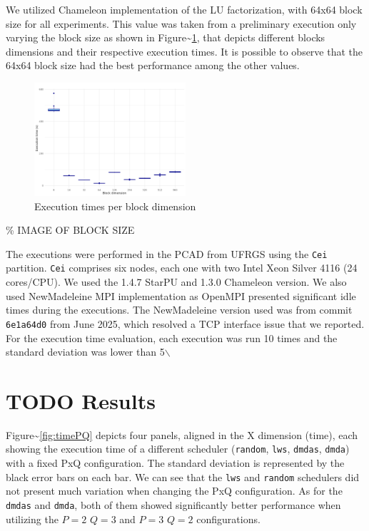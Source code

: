 \documentclass[conference, 10pt, final]{IEEEtran}
\begin{document}
We utilized Chameleon \cite{agullo:inria-00547847} implementation of the LU factorization, with 64x64 block size for all experiments. This value was taken from a preliminary execution only varying the block size as shown in Figure\textasciitilde{}\ref{fig:timeBlocks}, that depicts different blocks dimensions and their respective execution times. It is possible to observe that the 64x64 block size had the best performance among the other values.

\begin{figure}[ht]
\centering
\includegraphics[width=0.5\textwidth]{boxplot_tempo_por_nb.png}
\caption{Execution times per block dimension}
\label{fig:timeBlocks}
\end{figure}

\% IMAGE OF BLOCK SIZE

The executions were performed in the PCAD from UFRGS using the \verb|Cei| partition. \verb|Cei| comprises six nodes, each one with two Intel Xeon Silver 4116 (24 cores/CPU). We used the 1.4.7 StarPU and 1.3.0 Chameleon version. We also used NewMadeleine \cite{aumage2007new} MPI implementation as OpenMPI \cite{gabriel2004open} presented significant idle times during the executions. The NewMadeleine version used was from commit \verb|6e1a64d0| from June 2025, which resolved a TCP interface issue that we reported. For the execution time evaluation, each execution was run 10 times and the standard deviation was lower than 5$\backslash$%
\section{{\bfseries\sffamily TODO} Results}
\label{sec:results}
Figure\textasciitilde{}\ref{fig:timePQ} depicts four panels, aligned in the X dimension (time), each showing the execution time of a different scheduler (\verb|random|, \verb|lws|, \verb|dmdas|, \verb|dmda|) with a fixed PxQ configuration. The standard deviation is represented by the black error bars on each bar. We can see that the \verb|lws| and \verb|random| schedulers did not present much variation when changing the PxQ configuration. As for the \verb|dmdas| and \verb|dmda|, both of them showed significantly better performance when utilizing the \(P=2\) \(Q=3\) and \(P=3\) \(Q=2\) configurations.
\end{document}
